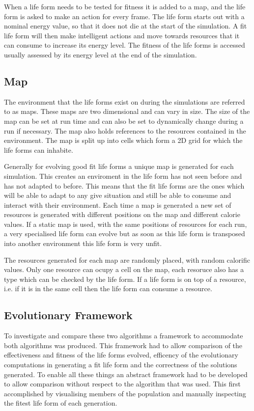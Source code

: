 \documentclass[12pt]{article}
\begin{document}
When a life form needs to be tested for fitness it is added to a map, and the life form is asked to make an action for every frame. The life form starts out
with a nominal energy value, so that it does not die at the start of the simulation. A fit life form will then make intelligent actions and move towards resources
that it can consume to increase its energy level. The fitness of the life forms is accessed usually assessed by its energy level at the end of the simulation. 


\subsection{Map}

The environment that the life forms exist on during the simulations are referred to as maps. These maps are two dimensional and can vary in size.
The size of the map can be set at run time and can also be set to dynamically change during a run if necessary. The map also holds references
to the resources contained in the environment. The map is split up into cells which form a 2D grid for which the life forms can inhabite. 

Generally for evolving good fit life forms a unique map is generated for each simulation. This creates an enviroment in the life form has not
seen before and has not adapted to before. This means that the fit life forms are the ones which will be able to adapt to any give situation
and still be able to consume and interact with their environment. Each time a map is generated a new set of resources is generated with different
positions on the map and different calorie values. If a static map is used, with the same positions of resources for each run, a very specialised 
life form can evolve but as soon as this life form is transposed into another environment this life form is very unfit.

The resources generated for each map are randomly placed, with random calorific values. Only one resource can ocupy a cell on the map, each resoruce also has
a type which can be checked by the life form. If a life form is on top of a resource, i.e. if it is in the same cell then the life form can consume a resource. 
 

\subsection{Evolutionary Framework}
To investigate and compare these two algorithms %
a framework to accommodate both algorithms was produced. This framework had to allow comparison of the effectiveness and fitness of the life forms evolved, efficency of the 
evolutionary computations in generating a fit life form and the correctness of the solutions generated. To enable all these things an abstract framework had 
to be developed to allow comparison without respect to the algorithm that was used. This first accomplished by visualising members of the population and 
manually inspecting the fitest life form of each generation. 
\end{document}
